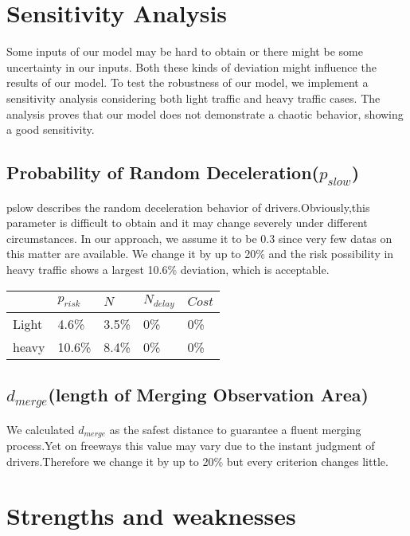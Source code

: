 \section{Sensitivity Analysis}
Some inputs of our model may be hard to obtain or there might be some uncertainty in our inputs. Both these kinds of deviation might influence the results of our model. To test the robustness of our model, we implement a sensitivity analysis considering both light traffic and heavy traffic cases. The analysis proves that our model does not demonstrate a chaotic behavior, showing a good sensitivity.
\subsection{Probability of Random Deceleration($p_{slow}$)}
  pslow describes the random deceleration behavior of drivers.Obviously,this parameter is difficult to obtain and it may change severely under different circumstances. In our approach, we assume it to be 0.3 since very few datas on this matter are available. We change it by up to 20\% and the risk possibility in heavy traffic shows a largest 10.6\% deviation, which is acceptable.

\begin{table}[h]
\centering
\begin{tabular}{|l|l|l|l|l|}
\hline

 &$p_{risk}$ & $N$ & $N_{delay}$ & $Cost$\\
\hline
Light &4.6\%&3.5\%&0\%&0\%\\
\hline
heavy&10.6\%&8.4\%&0\%&0\%\\
\hline
\end{tabular}
\end{table}

\subsection{$d_{merge}$(length of Merging Observation Area)}
We calculated $d_{merge}$ as the safest distance to guarantee a fluent merging process.Yet on freeways this value may vary due to the instant judgment of drivers.Therefore we change it by up to 20\% but every criterion changes little.
\section{Strengths and weaknesses}

